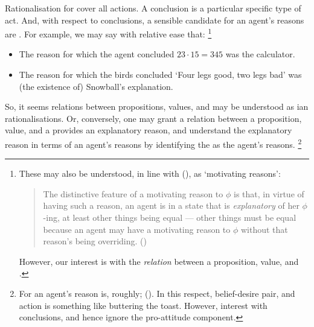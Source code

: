 \begin{note}
  Rationalisation for \citeauthor{Davidson:1963aa} cover all actions.
  A conclusion is a particular specific type of act.%
  And, with respect to conclusions, a sensible candidate for an agent's reasons are .
  For example, we may say with relative ease that:%
  \footnote{
    These may also be understood, in line with \citeauthor{Smith:1994wo} (\citeyear{Smith:1994wo}), as `motivating reasons':
    \begin{quote}
      The distinctive feature of a motivating reason to \(\phi\) is that, in virtue of having such a reason, an agent is in a state that is \emph{explanatory} of her \(\phi\)-ing, at least other things being equal --- other things must be equal because an agent may have a motivating reason to \(\phi\) without that reason's being overriding.%
      \mbox{}\hfill\mbox{(\citeyear{Smith:1994wo})}
    \end{quote}
    However, our interest is with the \emph{relation} between a proposition, value, and \pool{}.
  }

  \begin{itemize}[noitemsep]
  \item
    The reason for which the agent concluded \(23 \cdot 15 = 345\) was the calculator.
  \item
    The reason for which the birds concluded `Four legs good, two legs bad' was (the existence of) Snowball's explanation.
  \end{itemize}

  So, it seems relations between propositions, values, and  may be understood as \citeauthor{Davidson:1963aa}ian rationalisations.
  Or, conversely, one may grant a relation between a proposition, value, and a  provides an explanatory reason, and understand the explanatory reason in terms of an agent's reasons by identifying the  as the agent's reasons.%
  \footnote{
    For \citeauthor{Davidson:1963aa} an agent's reason is, roughly;  (\citeyear[685]{Davidson:1963aa}).
  In this respect, belief-desire pair, and action is something like buttering the toast.
  However, interest with conclusions, and hence ignore the pro-attitude component.
}
\end{note}

